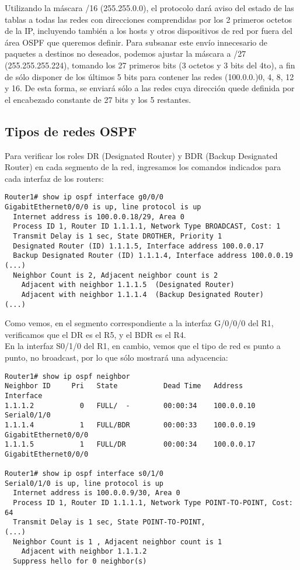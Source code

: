\documentclass{article}
\begin{document}
Utilizando la m\'ascara /16 (255.255.0.0), el protocolo dar\'a aviso del estado de las tablas a todas las redes con direcciones comprendidas por los 2 primeros octetos de la IP, incluyendo tambi\'en a los hosts y otros dispositivos de red por fuera del \'area OSPF que queremos definir. Para subsanar este env\'io innecesario de paquetes a destinos no deseados, podemos ajustar la m\'ascara a /27 (255.255.255.224), tomando los 27 primeros bits (3 octetos y 3 bits del 4to), a fin de s\'olo disponer de los \'ultimos 5 bits para contener las redes (100.0.0.)0, 4, 8, 12 y 16. De esta forma, se enviar\'a s\'olo a las redes cuya direcci\'on quede definida por el encabezado constante de 27 bits y los 5 restantes. \\

\subsection{Tipos de redes OSPF}
Para verificar los roles DR (Designated Router) y BDR (Backup Designated Router) en cada segmento de la red, ingresamos los comandos indicados para cada interfaz de los routers: \\

\begin{verbatim}
Router1# show ip ospf interface g0/0/0
GigabitEthernet0/0/0 is up, line protocol is up
  Internet address is 100.0.0.18/29, Area 0
  Process ID 1, Router ID 1.1.1.1, Network Type BROADCAST, Cost: 1
  Transmit Delay is 1 sec, State DROTHER, Priority 1
  Designated Router (ID) 1.1.1.5, Interface address 100.0.0.17
  Backup Designated Router (ID) 1.1.1.4, Interface address 100.0.0.19
(...)
  Neighbor Count is 2, Adjacent neighbor count is 2
    Adjacent with neighbor 1.1.1.5  (Designated Router)
    Adjacent with neighbor 1.1.1.4  (Backup Designated Router)
(...)
\end{verbatim}

Como vemos, en el segmento correspondiente a la interfaz G/0/0/0 del R1, verificamos que el DR es el R5, y el BDR es el R4. \\

En la interfaz S0/1/0 del R1, en cambio, vemos que el tipo de red es punto a punto, no broadcast, por lo que s\'olo mostrar\'a una adyacencia:

\begin{verbatim}
Router1# show ip ospf neighbor
Neighbor ID     Pri   State           Dead Time   Address         Interface
1.1.1.2           0   FULL/  -        00:00:34    100.0.0.10      Serial0/1/0
1.1.1.4           1   FULL/BDR        00:00:33    100.0.0.19      GigabitEthernet0/0/0
1.1.1.5           1   FULL/DR         00:00:34    100.0.0.17      GigabitEthernet0/0/0

Router1# show ip ospf interface s0/1/0
Serial0/1/0 is up, line protocol is up
  Internet address is 100.0.0.9/30, Area 0
  Process ID 1, Router ID 1.1.1.1, Network Type POINT-TO-POINT, Cost: 64
  Transmit Delay is 1 sec, State POINT-TO-POINT,
(...)
  Neighbor Count is 1 , Adjacent neighbor count is 1
    Adjacent with neighbor 1.1.1.2
  Suppress hello for 0 neighbor(s)
\end{verbatim}
\end{document}
